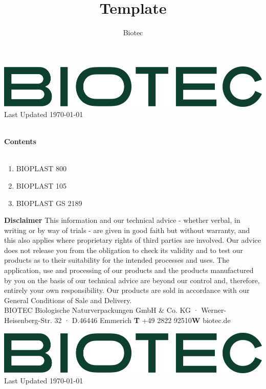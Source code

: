 \documentclass{article}
\title{Template}
\author{Biotec}
\newcommand\setItemnumber[1]{\setcounter{enumi}{\numexpr#1-1\relax}}
\begin{document}
\begin{flushleft}
\includegraphics[scale=0.20]{biotec}
\hfill\tiny Last Updated \today
\end{flushleft}
\begin{flushleft}
\hspace{1cm}\\
\textbf{Contents}\\
\hspace{5in}\\
\begin{enumerate}
\setItemnumber{2}
\item BIOPLAST 800\\
\setItemnumber{3}
\item BIOPLAST 105\\
\setItemnumber{4}
\item BIOPLAST GS 2189\\

\end{enumerate}
\end{flushleft}
\vspace*{\fill}
{\scriptsize
        \textbf{Disclaimer} This information and our technical advice - whether verbal, in writing or by way of trials - are given in good faith but without warranty, and this also applies where proprietary rights of third parties are involved. Our advice does not release you from the obligation to check its validity and to test our products as to their suitability for the intended processes and uses. The application, use and processing of our products and the products manufactured by you on the basis of our technical advice are beyond our control and, therefore, entirely your own responsibility. Our products are sold in accordance with our General Conditions of Sale and Delivery.\\ 
 BIOTEC Biologische Naturverpackungen GmbH \& Co. KG · Werner-Heisenberg-Str. 32 · D.46446 Emmerich \hfill \textbf{T} +49 2822 92510\qquad \textbf{W} biotec.de}
\clearpage
\begin{flushleft}
\includegraphics[scale=0.20]{biotec}
\hfill\tiny Last Updated \today
\end{flushleft}
\end{document}
